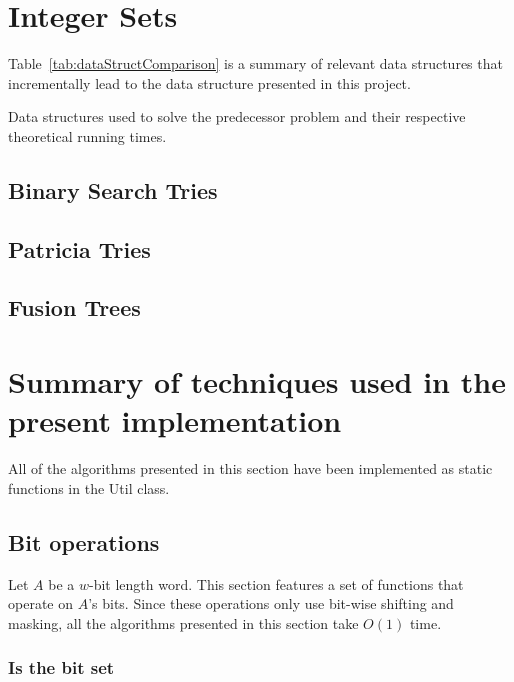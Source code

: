 \newpage
\section{Integer Sets}

Table~\ref{tab:dataStructComparison} is a summary of relevant data structures that incrementally lead to the data structure presented in this project.

\begin{table}[H]
\centering

\caption[Data structure comparison]{Data structures used to solve the predecessor problem and their respective theoretical running times.}
\label{tab:dataStructComparison}
\end{table}

\subsection{Binary Search Tries}

\subsection{Patricia Tries}

\subsection{Fusion Trees}

\newpage
\section{Summary of techniques used in the present implementation}

All of the algorithms presented in this section have been implemented as static functions in the {\ttfamily Util} class.

\subsection{Bit operations} \label{sec:bit}

Let $A$ be a $w$-bit length word. This section features a set of functions that operate on $A$'s bits. Since these operations only use bit-wise shifting and masking, all the algorithms presented in this section take $O(1)$ time.

\subsubsection{Is the bit set}

